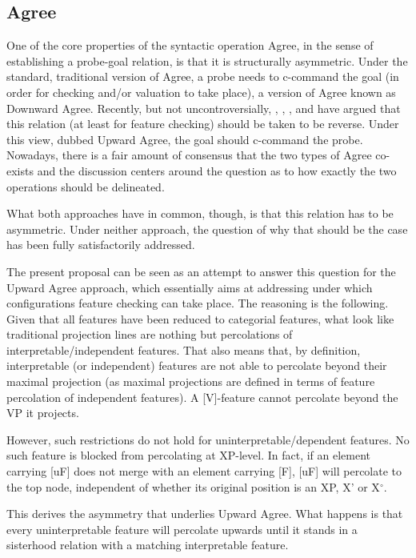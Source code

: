 \documentclass[output=paper
,modfonts
,nonflat]{langsci/langscibook}
\begin{document}
\subsection{Agree}
One of the core properties of the syntactic operation Agree, in the sense of establishing a probe-goal relation, is that it is structurally asymmetric. Under the standard, traditional version of Agree, a probe needs to c-command the goal (in order for checking and/or valuation to take place), a version of Agree known as Downward Agree. Recently, but not uncontroversially, \citet{Wurmbrand2012a}, \citet{Wurmbrand2012b}, \citet{Zeijlstra2012}, and \citet{Bjorkman_ZeijlstraTA} have argued that this relation (at least for feature checking) should be taken to be reverse. Under this view, dubbed Upward Agree, the goal should c-command the probe. Nowadays, there is a fair amount of consensus that the two types of Agree co-exists and the discussion centers around the question as to how exactly the two operations should be delineated.

What both approaches have in common, though, is that this relation has to be asymmetric. Under neither approach, the question of why that should be the case has been fully satisfactorily addressed. 

The present proposal can be seen as an attempt to answer this question for the Upward Agree approach, which essentially aims at addressing under which configurations feature checking can take place. The reasoning is the following. Given that all features have been reduced to categorial features, what look like traditional projection lines are nothing but percolations of interpretable/independent features. That also means that, by definition, interpretable (or independent) features are not able to percolate beyond their maximal projection (as maximal projections are defined in terms of feature percolation of independent features). A [V]-feature cannot percolate beyond the VP it projects.

However, such restrictions do not hold for uninterpretable/dependent features. No such feature is blocked from percolating at XP-level. In fact, if an element carrying [uF] does not merge with an element carrying [F], [uF] will percolate to the top node, independent of whether its original position is an XP, X’ or X$^{\circ}$. 

This derives the asymmetry that underlies Upward Agree. What happens is that every uninterpretable feature will percolate upwards until it stands in a sisterhood relation with a matching interpretable feature. 
\end{document}
